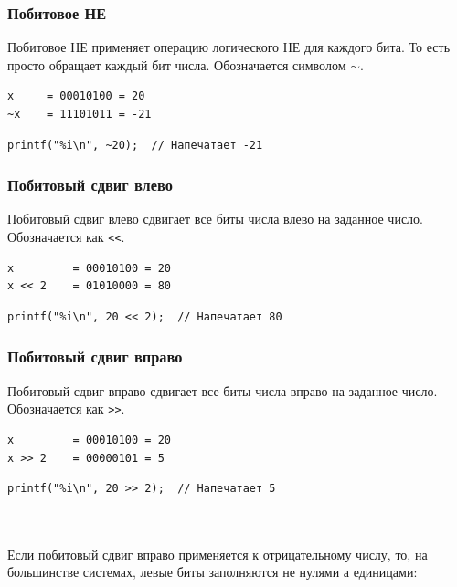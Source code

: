 \documentclass{article}
\begin{document}
\subsubsection*{Побитовое НЕ}
Побитовое НЕ применяет операцию логического НЕ для каждого бита. То есть просто обращает каждый бит числа. Обозначается символом $\sim$.\\

\begin{minipage}{0.35\textwidth}
\begin{verbatim}
x     = 00010100 = 20
~x    = 11101011 = -21
\end{verbatim}
\end{minipage}
\hfill
\begin{minipage}{0.55\textwidth}
\begin{lstlisting}
printf("%i\n", ~20);  // Напечатает -21
\end{lstlisting}
\end{minipage}

\subsubsection*{Побитовый сдвиг влево}
Побитовый сдвиг влево сдвигает все биты числа влево на заданное число. Обозначается как \texttt{<{}<}.\\

\begin{minipage}{0.35\textwidth}
\begin{verbatim}
x         = 00010100 = 20
x << 2    = 01010000 = 80
\end{verbatim}
\end{minipage}
\hfill
\begin{minipage}{0.55\textwidth}
\begin{lstlisting}
printf("%i\n", 20 << 2);  // Напечатает 80
\end{lstlisting}
\end{minipage}
\subsubsection*{Побитовый сдвиг вправо}
Побитовый сдвиг вправо сдвигает все биты числа вправо на заданное число. Обозначается как \texttt{>{}>}.\\

\begin{minipage}{0.35\textwidth}
\begin{verbatim}
x         = 00010100 = 20
x >> 2    = 00000101 = 5
\end{verbatim}
\end{minipage}
\hfill
\begin{minipage}{0.55\textwidth}
\begin{lstlisting}
printf("%i\n", 20 >> 2);  // Напечатает 5
\end{lstlisting}
\end{minipage}\\
\quad
\quad\\
Если побитовый сдвиг вправо применяется к отрицательному числу, то, на большинстве системах, левые биты заполняются не нулями а единицами:\\
\end{document}
